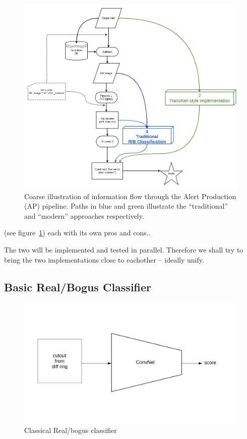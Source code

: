 \begin{figure}[h]
  \centering
  \includegraphics[width=.8\textwidth]{material/diagram}
  \caption{Coarse illustration of information flow through the Alert Production (AP) pipeline. Paths in blue and green illustrate the ``traditional'' and ``modern'' approaches respectively.}
  \label{fig:diagram}
\end{figure}


(see figure~\ref{fig:diagram})
each with its own pros and cons..

The two will be implemented and tested in parallel. Therefore we shall try to bring the two implementations close to eachother -- ideally unify.


\subsection{Basic Real/Bogus Classifier}

\begin{figure}[h]
  \centering
  \includegraphics[width=.8\textwidth]{material/rb-classifier}
  \caption{Classical Real/bogus classifier}
  \label{fig:rbdiagram}
\end{figure}

